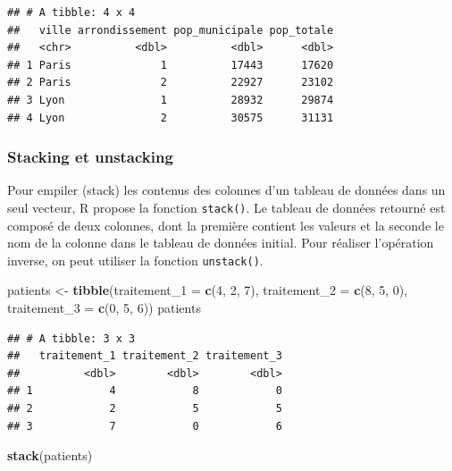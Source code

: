 \documentclass[
  11pt,
]{book}
\newenvironment{Shaded}{\begin{snugshade}}{\end{snugshade}}
\newcommand{\DataTypeTok}[1]{\textcolor[rgb]{0.13,0.29,0.53}{#1}}
\newcommand{\DecValTok}[1]{\textcolor[rgb]{0.00,0.00,0.81}{#1}}
\newcommand{\KeywordTok}[1]{\textcolor[rgb]{0.13,0.29,0.53}{\textbf{#1}}}
\newcommand{\NormalTok}[1]{#1}
\newcommand{\StringTok}[1]{\textcolor[rgb]{0.31,0.60,0.02}{#1}}
\numberwithin{equation}{section}
\numberwithin{countremarque}{section}
\begin{document}
\begin{lstlisting}
## # A tibble: 4 x 4
##   ville arrondissement pop_municipale pop_totale
##   <chr>          <dbl>          <dbl>      <dbl>
## 1 Paris              1          17443      17620
## 2 Paris              2          22927      23102
## 3 Lyon               1          28932      29874
## 4 Lyon               2          30575      31131
\end{lstlisting}

\hypertarget{stacking-et-unstacking}{%
\subsubsection{Stacking et unstacking}\label{stacking-et-unstacking}}

Pour empiler (stack) les contenus des colonnes d'un tableau de données dans un seul vecteur, R propose la fonction \texttt{stack()}. Le tableau de données retourné est composé de deux colonnes, dont la première contient les valeurs et la seconde le nom de la colonne dans le tableau de données initial. Pour réaliser l'opération inverse, on peut utiliser la fonction \texttt{unstack()}.

\begin{Shaded}
\begin{Highlighting}[]
\NormalTok{patients \textless{}{-}}\StringTok{ }
\StringTok{  }\KeywordTok{tibble}\NormalTok{(}\DataTypeTok{traitement\_1 =} \KeywordTok{c}\NormalTok{(}\DecValTok{4}\NormalTok{, }\DecValTok{2}\NormalTok{, }\DecValTok{7}\NormalTok{),}
         \DataTypeTok{traitement\_2 =} \KeywordTok{c}\NormalTok{(}\DecValTok{8}\NormalTok{, }\DecValTok{5}\NormalTok{, }\DecValTok{0}\NormalTok{),}
         \DataTypeTok{traitement\_3 =} \KeywordTok{c}\NormalTok{(}\DecValTok{0}\NormalTok{, }\DecValTok{5}\NormalTok{, }\DecValTok{6}\NormalTok{))}
\NormalTok{patients}
\end{Highlighting}
\end{Shaded}

\begin{lstlisting}
## # A tibble: 3 x 3
##   traitement_1 traitement_2 traitement_3
##          <dbl>        <dbl>        <dbl>
## 1            4            8            0
## 2            2            5            5
## 3            7            0            6
\end{lstlisting}

\begin{Shaded}
\begin{Highlighting}[]
\KeywordTok{stack}\NormalTok{(patients)}
\end{Highlighting}
\end{Shaded}
\end{document}
